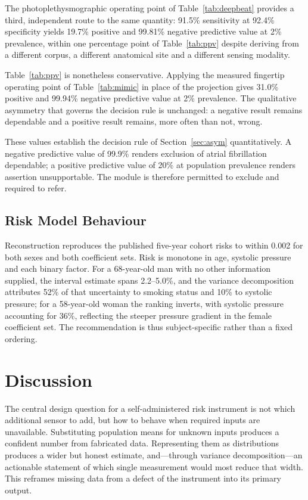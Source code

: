 \documentclass[conference]{IEEEtran}
\begin{document}
The photoplethysmographic operating point of Table~\ref{tab:deepbeat} provides a third,
independent route to the same quantity: 91.5\% sensitivity at 92.4\% specificity yields
19.7\% positive and 99.81\% negative predictive value at 2\% prevalence, within one
percentage point of Table~\ref{tab:ppv} despite deriving from a different corpus, a
different anatomical site and a different sensing modality.

Table~\ref{tab:ppv} is nonetheless conservative. Applying the measured fingertip
operating point of Table~\ref{tab:mimic} in place of the projection gives 31.0\%
positive and 99.94\% negative predictive value at 2\% prevalence. The qualitative
asymmetry that governs the decision rule is unchanged: a negative result remains
dependable and a positive result remains, more often than not, wrong.

These values establish the decision rule of Section~\ref{sec:asym} quantitatively.
A negative predictive value of 99.9\% renders exclusion of atrial fibrillation
dependable; a positive predictive value of 20\% at population prevalence renders
assertion unsupportable. The module is therefore permitted to exclude and required
to refer.

\subsection{Risk Model Behaviour}
Reconstruction reproduces the published five-year cohort risks to within 0.002 for
both sexes and both coefficient sets. Risk is monotone in age, systolic pressure
and each binary factor. For a 68-year-old man with no other information supplied,
the interval estimate spans 2.2--5.0\%, and the variance decomposition attributes
52\% of that uncertainty to smoking status and 10\% to systolic pressure; for a
58-year-old woman the ranking inverts, with systolic pressure accounting for 36\%,
reflecting the steeper pressure gradient in the female coefficient set. The
recommendation is thus subject-specific rather than a fixed ordering.

\section{Discussion}

The central design question for a self-administered risk instrument is not which
additional sensor to add, but how to behave when required inputs are unavailable.
Substituting population means for unknown inputs produces a confident number from
fabricated data. Representing them as distributions produces a wider but honest
estimate, and---through variance decomposition---an actionable statement of which
single measurement would most reduce that width. This reframes missing data from a
defect of the instrument into its primary output.
\end{document}
